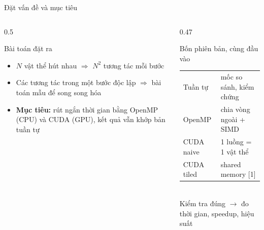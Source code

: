 \documentclass[aspectratio=169,11pt]{beamer}
\begin{document}
\begin{frame}{Đặt vấn đề và mục tiêu}
\begin{columns}[T]
\begin{column}{0.5\textwidth}
\begin{block}{Bài toán đặt ra}
\small
\begin{itemize}
\setlength{\itemsep}{5pt}
\item $N$ vật thể hút nhau $\Rightarrow$ \alert{$N^2$ tương tác} mỗi bước
\item Các tương tác trong một bước \alert{độc lập} $\Rightarrow$ bài toán mẫu để song song hóa
\item \textbf{Mục tiêu:} rút ngắn thời gian bằng \alert{OpenMP} (CPU) và \alert{CUDA} (GPU), kết quả vẫn khớp bản tuần tự
\end{itemize}
\end{block}
\end{column}
\begin{column}{0.47\textwidth}
\begin{block}{Bốn phiên bản, cùng đầu vào}
\small
\setlength{\tabcolsep}{4pt}
\begin{tabular}{ll}
\toprule
Tuần tự & mốc so sánh, kiểm chứng \\
OpenMP & chia vòng ngoài + SIMD \\
CUDA naive & 1 luồng = 1 vật thể \\
CUDA tiled & shared memory [1] \\
\bottomrule
\end{tabular}\\[8pt]
Kiểm tra đúng $\to$ đo thời gian, speedup, hiệu suất
\end{block}
\end{column}
\end{columns}
\end{frame}
\end{document}
